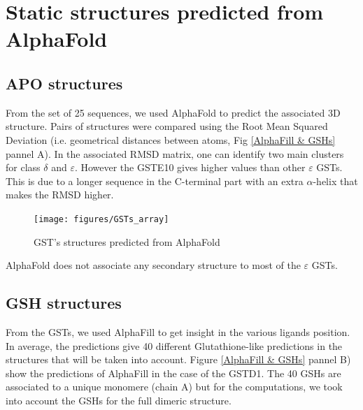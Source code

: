 \section{Static structures predicted from AlphaFold}
\subsection{APO structures}
From the set of 25 sequences, we used AlphaFold to predict the associated 3D structure. Pairs of structures were compared using the Root Mean Squared Deviation (i.e. geometrical distances between atoms, Fig \ref{AlphaFill & GSHs} pannel A). In the associated RMSD matrix, one can identify two main clusters for class $\delta$ and $\varepsilon$. However the GSTE10 gives higher values than other $\varepsilon$ GSTs. This is due to a longer sequence in the C-terminal part with an extra $\alpha$-helix that makes the RMSD higher.

\begin{figure}
	\label{AlphaFold structures}
	\texttt{[image: figures/GSTs\_array]}
	\caption{GST's structures predicted from AlphaFold}
\end{figure}

AlphaFold does not associate any secondary structure to most of the $\varepsilon$ GSTs.

\subsection{GSH structures}
From the GSTs, we used AlphaFill to get insight in the various ligands position. In average, the predictions give 40 different Glutathione-like predictions in the structures that will be taken into account. Figure \ref{AlphaFill & GSHs} pannel B) show the predictions of AlphaFill in the case of the GSTD1. The 40 GSHs are associated to a unique monomere (chain A) but for the computations, we took into account the GSHs for the full dimeric structure.

